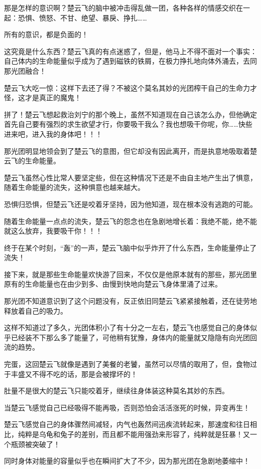 那是怎样的意识啊？楚云飞的脑中被冲击得乱做一团，各种各样的情感交织在一起：恐惧、愤怒、不甘、绝望、暴戾、挣扎……

所有的意识，都是负面的！

这究竟是什么东西？楚云飞真的有点迷惑了，但是，他马上不得不面对一个事实：自己体内的生命能量似乎成为了遇到磁铁的铁屑，在极力挣扎地向体外涌去，去同那光团融合！

楚云飞大吃一惊：这样下去还了得？不被这个莫名其妙的光团榨干自己的生命力才怪，这才是真正的魔鬼！

拼了！楚云飞想起救治刘宁的那个晚上，虽然不知道现在自己该怎么办，但他确定首先自己要有强烈的求生欲望才行，你要吸干我么？我也想吸干你呢，你……快些进来吧，进入我的身体吧！！！

那光团明显地领会到了楚云飞的意图，但它却没有因此离开，而是执意地吸取着楚云飞的生命能量。

楚云飞虽然心性比常人要坚定些，但在这种情况下还是不由自主地产生出了惧意，随着生命能量的流失，这种惧意也越来越大。

恐惧归恐惧，但楚云飞还是咬着牙坚持，因为他知道，现在根本没有逃跑的可能。

随着生命能量一点点的流失，楚云飞的怨念也在急剧地增长着：我绝不能，绝不能就这么放弃，我要吸干你！！！

终于在某个时刻，“轰”的一声，楚云飞脑中似乎炸开了什么东西，生命能量停止了流失！

接下来，就是那些生命能量欢快游了回来，不仅仅是他原本就有的那些，那光团里原有的生命能量也在由少到多、由慢到快地向楚云飞身体里涌了过来。

那光团不知道意识到了这个问题没有，反正依旧同楚云飞紧紧接触着，还在徒劳地释放着自己的吸力。

这样不知道过了多久，光团体积小了有十分之一左右，楚云飞也感觉自己的身体似乎已经装不下那么多了能量了，可他稍有犹豫，身体内的能量就又隐隐有向光团回流的趋势。

完蛋，这回楚云飞就像是遇到了美餐的老饕，虽然可以尽情的取用了，但，食物过于丰盛又不得不吃的话，那是会被撑坏的！

肚量不是很大的楚云飞只能咬着牙，继续往身体装这种莫名其妙的东西。

当楚云飞感觉自己已经吸得不能再吸，否则恐怕会活活涨死的时候，异变再生！

楚云飞感觉自己的身体骤然间减轻，内气也轰然间迅疾流转起来，那速度和往日相比，纯粹是乌龟和兔子的差别，而且都不能用强劲来形容了，纯粹就是狂暴！又一个瓶颈被突破了！

同时身体对能量的容量似乎也在瞬间扩大了不少，因为那光团在急剧地萎缩中！

